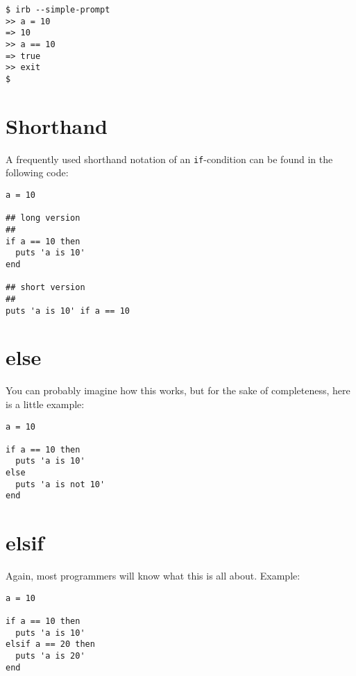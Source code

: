 \documentclass[a4paper]{book}
\begin{document}
\begin{shaded}\begin{verbatim}
$ irb --simple-prompt
>> a = 10
=> 10
>> a == 10
=> true
>> exit
$
\end{verbatim}\end{shaded}

\section{Shorthand}\label{shorthand}

A frequently used shorthand notation of an \texttt{if}-condition can be found in the following code:

\begin{shaded}\begin{verbatim}
a = 10

## long version
##
if a == 10 then
  puts 'a is 10'
end

## short version
##
puts 'a is 10' if a == 10
\end{verbatim}\end{shaded}

\section{else}\label{else}

You can probably imagine how this works, but for the sake of completeness, here is a little example:

\begin{shaded}\begin{verbatim}
a = 10

if a == 10 then
  puts 'a is 10'
else
  puts 'a is not 10'
end
\end{verbatim}\end{shaded}

\section{elsif}\label{elsif}

Again, most programmers will know what this is all about. Example:

\begin{shaded}\begin{verbatim}
a = 10

if a == 10 then
  puts 'a is 10'
elsif a == 20 then
  puts 'a is 20'
end
\end{verbatim}\end{shaded}
\end{document}
